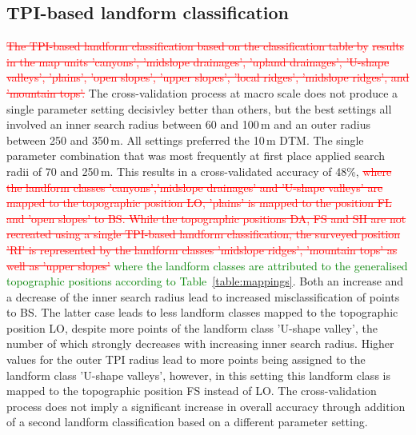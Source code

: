 \documentclass[preprint,12pt,authoryear]{elsarticle}
\begin{document}
\subsection{TPI-based landform classification}
\textcolor{red}{\sout{The TPI-based landform classification based on the  classification table by}} \cite{Weiss2000} \textcolor{red}{\sout{results in the map units 'canyons', 'midslope drainages', 'upland drainages', 'U-shape valleys', 'plains', 'open slopes', 'upper slopes', 'local ridges', 'midslope ridges', and 'mountain tops'.}} The cross-validation process at macro scale does not produce a single parameter setting decisivley better than others, but the best settings all involved an inner search radius between 60 and 100\,m and an outer radius between 250  and 350\,m. All settings preferred the 10\,m DTM. The single parameter combination that was most frequently at first place applied search radii of 70 and 250\,m. This results in a cross-validated accuracy of 48\%, \textcolor{red}{\sout{where the landform classes 'canyons','midslope drainages' and 'U-shape valleys' are mapped to the topographic position LO, 'plains' is mapped to the position FL and 'open slopes' to BS. While the topographic positions DA, FS and SH are not recreated using a single TPI-based landform classification, the surveyed position 'RI' is represented by the landform classes 'midslope ridges', 'mountain tops' as well as 'upper slopes'}} \textcolor{green} {where the landform classes are attributed to the generalised topographic positions according to Table~\ref{table:mappings}}. Both an increase and a decrease of the inner search radius lead to increased misclassification of points to BS. The latter case leads to less landform classes mapped to the topographic position LO, despite more points of the landform class 'U-shape valley', the number of which strongly decreases with increasing inner search radius. Higher values for the outer TPI radius lead to more points being assigned to the landform class 'U-shape valleys', however, in this setting this landform class is mapped to the topographic position FS instead of LO. The cross-validation process does not imply a significant increase in overall accuracy through addition of a second landform classification based on a different parameter setting.   
\end{document}
